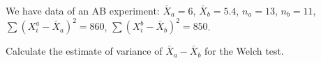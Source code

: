 
\begin{question}
We have data of an AB experiment: \(\bar X_a = 6\), \(\bar X_b = 5.4\),
\(n_a = 13\), \(n_b = 11\), \(\sum (X_i^a - \bar X_a)^2 = 860\),
\(\sum (X_i^b - \bar X_b)^2 = 850\).

Calculate the estimate of variance of \(\bar X_a - \bar X_b\) for the Welch test.


\end{question}


